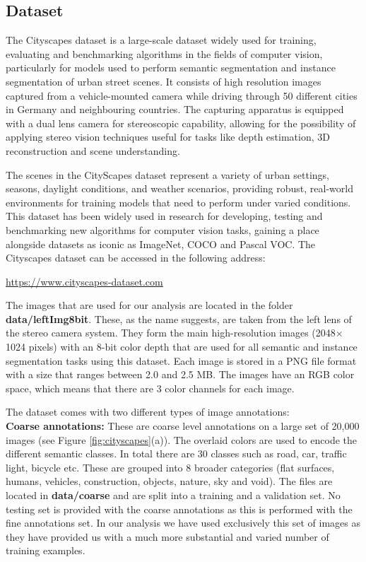 \subsection{Dataset}

The Cityscapes dataset is a large-scale dataset widely used for training, evaluating and benchmarking algorithms in the fields of computer vision, particularly for models used to perform semantic segmentation and instance segmentation of urban street scenes. It consists of high resolution images captured from a vehicle-mounted camera while driving through 50 different cities in Germany and neighbouring countries. The capturing apparatus is equipped with a dual lens camera for stereoscopic capability, allowing for the possibility of applying stereo vision techniques useful for tasks like depth estimation, 3D reconstruction and scene understanding. 

The scenes in the CityScapes dataset represent a variety of urban settings, seasons, daylight conditions, and weather scenarios, providing robust, real-world environments for training models that need to perform under varied conditions. This dataset has been widely used in research for developing, testing and benchmarking new algorithms for computer vision tasks, gaining a place alongside datasets as iconic as ImageNet, COCO and Pascal VOC. The Cityscapes dataset can be accessed in the following address:
\begin{center}
\url{https://www.cityscapes-dataset.com}
\end{center}

The images that are used for our analysis are located in the folder \textbf{data/leftImg8bit}. These, as the name suggests, are taken from the left lens of the stereo camera system. They form the main high-resolution images (2048$\times$1024 pixels) with an 8-bit color depth that are used for all semantic and instance segmentation tasks using this dataset. Each image is stored in a PNG file format with a size that ranges between 2.0 and 2.5 MB. The images have an RGB color space, which means that there are 3 color channels for each image.

The dataset comes with two different types of image annotations:\\
\textbf{Coarse annotations:} These are coarse level annotations on a large set of 20,000 images (see Figure \ref{fig:cityscapes}(a)). The overlaid colors are used to encode the different semantic classes. In total there are 30 classes such as road, car, traffic light, bicycle etc. These are grouped into 8 broader categories (flat surfaces, humans, vehicles, construction, objects, nature, sky and void). The files are located in \textbf{data/coarse} and are split into a training and a validation set. No testing set is provided with the coarse annotations as this is performed with the fine annotations set. In our analysis we have used exclusively this set of images as they have provided us with a much more substantial and varied number of training examples. 

